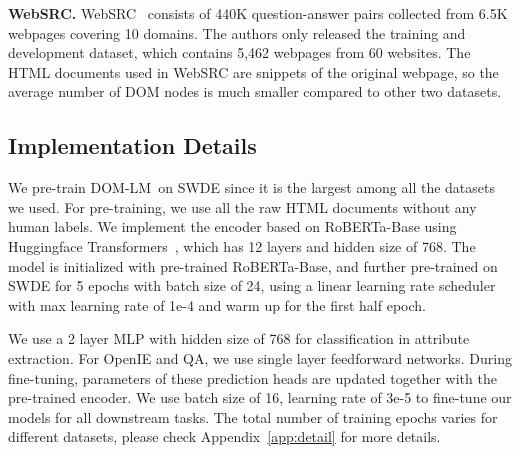 \documentclass[sigconf, nonacm]{acmart}
\newcommand{\ours}[0]{DOM-LM}
\newcommand{\nop}[1]{}
\begin{document}
\vspace{0.1em}
\noindent\textbf{WebSRC.} WebSRC~\cite{chen2021websrc} consists of 440K question-answer pairs collected from 6.5K webpages covering 10 domains. The authors only released the training and development dataset, which contains 5,462 webpages from 60 websites. The HTML documents used in WebSRC are snippets of the original webpage, so the average number of DOM nodes is much smaller compared to other two datasets. 

\subsection{Implementation Details}
We pre-train \ours\ on SWDE since it is the largest among all the datasets we used.  For pre-training, we use all the raw HTML documents without any human labels. We implement the encoder based on RoBERTa-Base using Huggingface Transformers~\cite{wolf-etal-2020-transformers}, which has 12 layers and hidden size of 768. The model is initialized with pre-trained RoBERTa-Base, and further pre-trained on SWDE for 5 epochs with batch size of 24, using a linear learning rate scheduler with max learning rate of 1e-4 and warm up for the first half epoch.

We use a 2 layer MLP with hidden size of 768 for classification in attribute extraction. For OpenIE and QA, we use single layer feedforward networks. During fine-tuning, parameters of these prediction heads are updated together with the pre-trained encoder. We use batch size of 16, learning rate of 3e-5 to fine-tune our models for all downstream tasks. The total number of training epochs varies for different datasets, please check Appendix~\ref{app:detail} for more details.
\nop{I think it would help to make clear whether data for fine-tuning was part of pre-training as well. This was the confusing part during first reading. For a new reader, it may not be clear.}
\nop{Another baseline I think maybe worth adding here is RoBERTa-Base-pretrain, which pretrains a vanilla RoBERT encoder on the HTML corpus. Otherwise people may argue that we can treat HTML file as normal text and it may only need some pretraining adaptation.}
\nop{One thing missing here is the model hyperparameter settings.}
\end{document}
